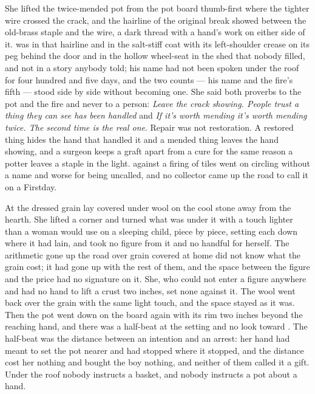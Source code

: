 She lifted the twice-mended pot from the pot board thumb-first where the tighter wire crossed the crack, and the hairline of the original break showed between the old-brass staple and the wire, a dark thread with a hand's work on either side of it.  was in that hairline and in the salt-stiff coat with its left-shoulder crease on its peg behind the door and in the hollow wheel-seat in the shed that nobody filled, and not in a story anybody told; his name had not been spoken under the roof for four hundred and five days, and the two counts --- his name and the fire's fifth --- stood side by side without becoming one. She said both proverbs to the pot and the fire and never to a person: \emph{Leave the crack showing. People trust a thing they can see has been handled} and \emph{If it's worth mending it's worth mending twice. The second time is the real one}. Repair was not restoration. A restored thing hides the hand that handled it and a mended thing leaves the hand showing, and a surgeon keeps a graft apart from a cure for the same reason a potter leaves a staple in the light.  against a firing of tiles went on circling without a name and worse for being uncalled, and no collector came up the road to call it on a Firstday.

At  the dressed grain lay covered under wool on the cool stone away from the hearth. She lifted a corner and turned what was under it with a touch lighter than a woman would use on a sleeping child, piece by piece, setting each down where it had lain, and took no figure from it and no handful for herself. The arithmetic gone up the road over grain covered at home did not know what the grain cost; it had gone up with the rest of them, and the space between the figure and the price had no signature on it. She, who could not enter a figure anywhere and had no hand to lift a crust two inches, set none against it. The wool went back over the grain with the same light touch, and the space stayed as it was. Then the pot went down on the board again with its rim two inches beyond the reaching hand, and there was a half-beat at the setting and no look toward . The half-beat was the distance between an intention and an arrest: her hand had meant to set the pot nearer and had stopped where it stopped, and the distance cost her nothing and bought the boy nothing, and neither of them called it a gift. Under the roof nobody instructs a basket, and nobody instructs a pot about a hand.


